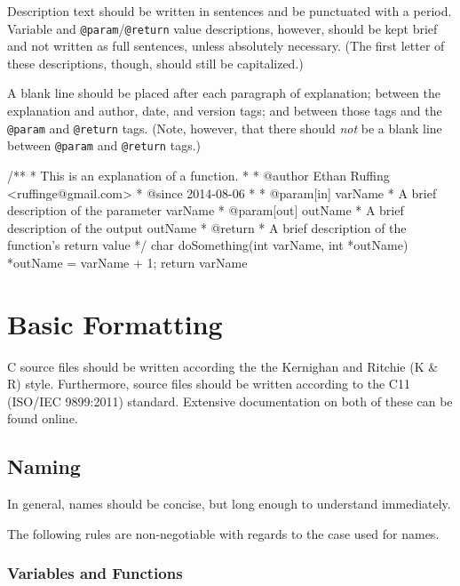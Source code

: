 \documentclass[11pt]{book}
\begin{document}
Description text should be written in sentences and be punctuated with a
period. Variable and \texttt{@param}/\texttt{@return} value
descriptions, however, should be kept brief and not written as full
sentences, unless absolutely necessary. (The first letter of these
descriptions, though, should still be capitalized.)

A blank line should be placed after each paragraph of explanation;
between the explanation and author, date, and version tags; and between
those tags and the \texttt{@param} and \texttt{@return} tags. (Note,
however, that there should \emph{not} be a blank line between
\texttt{@param} and \texttt{@return} tags.)

\begin{code}[caption=Example of Doxygen comments.,label=lst:doxygen-example]
/**
 * This is an explanation of a function.
 *
 * @author Ethan Ruffing <ruffinge@gmail.com>
 * @since 2014-08-06
 *
 * @param[in] varName
 *     A brief description of the parameter varName
 * @param[out] outName
 *     A brief description of the output outName
 * @return
 *     A brief description of the function's return value
 */
char doSomething(int varName, int *outName) {
    *outName = varName + 1;
    return varName %
}
\end{code}

\chapter{Basic Formatting}\label{basic-formatting}

C source files should be written according the the Kernighan and Ritchie
(K \& R) style. Furthermore, source files should be written according to
the C11 (ISO/IEC 9899:2011) standard. Extensive documentation on both of
these can be found online.

\section{Naming}\label{naming}

In general, names should be concise, but long enough to understand
immediately.

The following rules are non-negotiable with regards to the case used for
names.

\subsection{Variables and Functions}\label{variables-and-functions}
\end{document}

